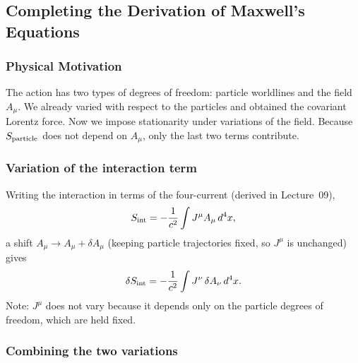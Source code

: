\subsection{Completing the Derivation of Maxwell's Equations}\label{subsec:lec10-maxwell}

\subsubsection*{Physical Motivation}
The action has two types of degrees of freedom: particle worldlines and the field $A_\mu$.  We already
varied with respect to the particles and obtained the covariant Lorentz force.  Now we impose
stationarity under variations of the field.  Because $S_{\rm particle}$ does not depend on $A_\mu$,
only the last two terms contribute.

\subsubsection*{Variation of the interaction term}

Writing the interaction in terms of the four-current (derived in Lecture~09),
\begin{equation}\label{eq:lec10:Sint-J}
  S_{\rm int}
  =
  -\frac{1}{c^2}\int J^\mu A_\mu\,d^4x ,
\end{equation}
a shift $A_\mu\to A_\mu+\delta A_\mu$ (keeping particle trajectories fixed, so $J^\mu$ is unchanged)
gives
\begin{equation}\label{eq:lec10:dSint}
  \delta S_{\rm int}
  =
  -\frac{1}{c^2}\int J^\nu\,\delta A_\nu\,d^4x .
\end{equation}
Note: $J^\mu$ does not vary because it depends only on the particle degrees of freedom, which are
held fixed.

\subsubsection*{Combining the two variations}

